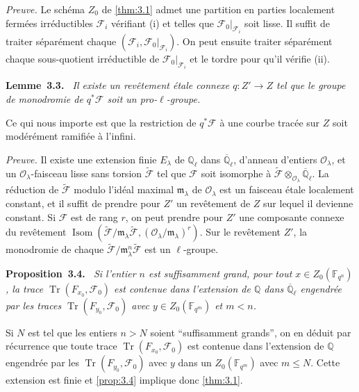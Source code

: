 \documentclass[10pt,a4paper]{article}
\makeatletter
\theoremstyle{plain}
\theoremstyle{definition}
\newenvironment{manualblock}[4]{%
  \par\medskip\noindent\textbf{#1~#2#3.}\def\@currentlabel{#2}\label{#4}\itshape\ }{\par\normalfont\medskip}
\DeclareMathOperator{\tr}{Tr}
\DeclareMathOperator{\Isom}{Isom}
\makeatother
\begin{document}
\noindent\textit{Preuve.} Le sch\'ema $Z_0$ de \ref{thm:3.1} admet une partition en parties localement ferm\'ees irr\'eductibles $\mathcal{F}_i$ v\'erifiant (i) et telles que $\mathcal{F}_0|_{\mathcal{F}_i}$ soit lisse. Il suffit de traiter s\'epar\'ement chaque $(\mathcal{F}_i, \mathcal{F}_0|_{\mathcal{F}_i})$. On peut ensuite traiter s\'epar\'ement chaque sous-quotient irr\'eductible de $\mathcal{F}_0|_{\mathcal{F}_i}$ et le tordre pour qu'il v\'erifie (ii).

\begin{manualblock}{Lemme}{3.3}{}{lem:3.3}
Il existe un rev\^etement \'etale connexe $q: Z' \to Z$ tel que le groupe de monodromie de $q^*\mathcal{F}$ soit un pro-$\ell$-groupe.
\end{manualblock}

Ce qui nous importe est que la restriction de $q^*\mathcal{F}$ \`a une courbe trac\'ee sur $Z$ soit mod\'er\'ement ramifi\'ee \`a l'infini.

\noindent\textit{Preuve.} Il existe une extension finie $E_\lambda$ de $\mathbb{Q}_\ell$ dans $\overline{\mathbb{Q}}_\ell$, d'anneau d'entiers $\mathcal{O}_\lambda$, et un $\mathcal{O}_\lambda$-faisceau lisse sans torsion $\tilde{\mathcal{F}}$ tel que $\mathcal{F}$ soit isomorphe \`a $\tilde{\mathcal{F}} \otimes_{\mathcal{O}_\lambda} \overline{\mathbb{Q}}_\ell$. La r\'eduction de $\tilde{\mathcal{F}}$ modulo l'id\'eal maximal $\mathfrak{m}_\lambda$ de $\mathcal{O}_\lambda$ est un faisceau \'etale localement constant, et il suffit de prendre pour $Z'$ un rev\^etement de $Z$ sur lequel il devienne constant. Si $\mathcal{F}$ est de rang $r$, on peut prendre pour $Z'$ une composante connexe du rev\^etement $\Isom(\tilde{\mathcal{F}}/\mathfrak{m}_\lambda\tilde{\mathcal{F}}, (\mathcal{O}_\lambda/\mathfrak{m}_\lambda)^r)$. Sur le rev\^etement $Z'$, la monodromie de chaque $\tilde{\mathcal{F}}/\mathfrak{m}_\lambda^n\tilde{\mathcal{F}}$ est un $\ell$-groupe.

\begin{manualblock}{Proposition}{3.4}{}{prop:3.4}
Si l'entier $n$ est suffisamment grand, pour tout $x \in Z_0(\mathbb{F}_{q^n})$, la trace $\tr(F_{x_0}, \mathcal{F}_0)$ est contenue dans l'extension de $\mathbb{Q}$ dans $\overline{\mathbb{Q}}_\ell$ engendr\'ee par les traces $\tr(F_{y_0}, \mathcal{F}_0)$ avec $y \in Z_0(\mathbb{F}_{q^m})$ et $m < n$.
\end{manualblock}

Si $N$ est tel que les entiers $n > N$ soient ``suffisamment grands'', on en d\'eduit par r\'ecurrence que toute trace $\tr(F_{x_0}, \mathcal{F}_0)$ est contenue dans l'extension de $\mathbb{Q}$ engendr\'ee par les $\tr(F_{y_0}, \mathcal{F}_0)$ avec $y$ dans un $Z_0(\mathbb{F}_{q^m})$ avec $m \leq N$. Cette extension est finie et \ref{prop:3.4} implique donc \ref{thm:3.1}.
\end{document}
